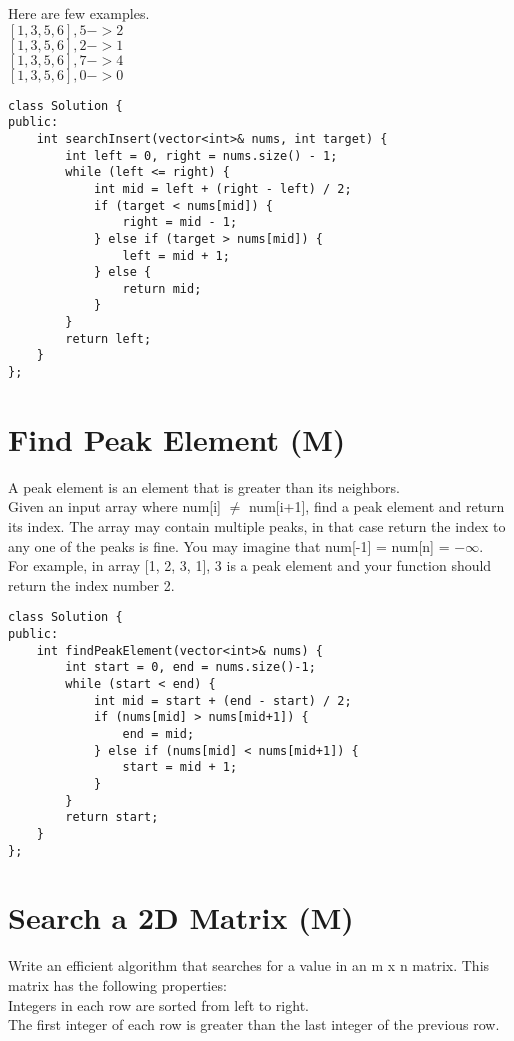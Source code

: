 Here are few examples.\\
$[1,3,5,6], 5 -> 2$\\
$[1,3,5,6], 2 -> 1$\\
$[1,3,5,6], 7 -> 4$\\
$[1,3,5,6], 0 -> 0$\\

\begin{lstlisting}
class Solution {
public:
    int searchInsert(vector<int>& nums, int target) {
        int left = 0, right = nums.size() - 1;
        while (left <= right) {
            int mid = left + (right - left) / 2;
            if (target < nums[mid]) {
                right = mid - 1;
            } else if (target > nums[mid]) {
                left = mid + 1;
            } else {
                return mid;
            }
        }
        return left;
    }
};
\end{lstlisting}


\section{Find Peak Element (M)}
A peak element is an element that is greater than its neighbors.\\

Given an input array where num[i] $\neq$ num[i+1], find a peak element and return its index.
The array may contain multiple peaks, in that case return the index to any one of the peaks is fine.
You may imagine that num[-1] = num[n] = $-\infty$.\\

For example, in array [1, 2, 3, 1], 3 is a peak element and your function should return the index number 2.\\

\begin{lstlisting}
class Solution {
public:
    int findPeakElement(vector<int>& nums) {
        int start = 0, end = nums.size()-1;
        while (start < end) {
            int mid = start + (end - start) / 2;
            if (nums[mid] > nums[mid+1]) {
                end = mid;
            } else if (nums[mid] < nums[mid+1]) {
                start = mid + 1;
            }
        }
        return start;
    }
};
\end{lstlisting}


\section{Search a 2D Matrix (M)}
Write an efficient algorithm that searches for a value in an m x n matrix. This matrix has the following properties:\\
    Integers in each row are sorted from left to right.\\
    The first integer of each row is greater than the last integer of the previous row.\\

